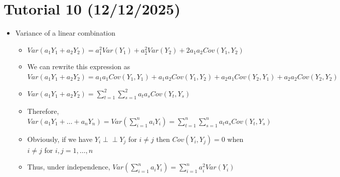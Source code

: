 \documentclass{article}
\newcommand{\indep}{\perp\!\!\!\perp}
\begin{document}
\section{Tutorial 10 (12/12/2025)}
\begin{itemize}
    \item Variance of a linear combination
    \begin{itemize}
        \item $Var(a_1Y_1+a_2Y_2) = a_1^2Var(Y_1)+a_2^2Var(Y_2)+2a_1a_2Cov(Y_1,Y_2)$
        \item We can rewrite this expression as $Var(a_1Y_1+a_2Y_2) = a_1a_1 Cov(Y_1,Y_1) + a_1a_2Cov(Y_1,Y_2) + a_2a_1Cov(Y_2,Y_1) + a_2a_2 Cov(Y_2,Y_2)$
        \item $Var(a_1Y_1 + a_2Y_2) = \sum_{t=1}^2 \sum_{s=1}^2 a_ta_sCov(Y_t,Y_s)$
        \item Therefore, $Var(a_1Y_1+\dots+a_nY_n) = Var\left( \sum_{i=1}^n a_iY_i \right) = \sum_{t=1}^n \sum_{s=1}^n a_ta_s Cov(Y_t,Y_s)$
        \item Obviously, if we have $Y_i \indep Y_j$ for $i \neq j$ then $Cov(Y_i,Y_j) = 0$ when $i \neq j$ for $i,j = 1,\dots,n$
        \item Thus, under independence, $Var\left( \sum_{i=1}^n a_iY_i \right) = \sum_{i=1}^n a_i^2Var(Y_i)$
    \end{itemize}

\end{itemize}
\end{document}
